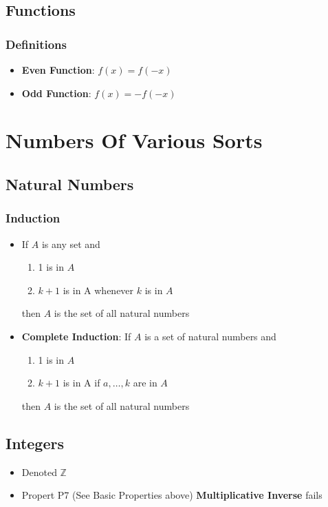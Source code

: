 \documentclass{report}
\begin{document}
\section{Functions}
\subsection*{Definitions}
\begin{itemize}
	\item \textbf{Even Function}: $f (x) = f (-x)$
	\item \textbf{Odd Function}: $f (x) = -f (-x)$
\end{itemize}

\chapter{Numbers Of Various Sorts}%
  \section{Natural Numbers}%
  
  \subsection{Induction}%
    \begin{itemize}
      \item If $A$ is any set and
        \begin{enumerate}
          \item 1 is in $A$
          \item $k+1$ is in A whenever $k$ is in $A$
        \end{enumerate}
        then $A$ is the set of all natural numbers
      \item \textbf{Complete Induction}: If $A$ is a set of natural
          numbers and
        \begin{enumerate}
          \item 1 is in $A$
          \item $k+1$ is in A if $a, \dots, k$ are in $A$
        \end{enumerate}
        then $A$ is the set of all natural numbers
    \end{itemize}

  \section{Integers}
    \begin{itemize}
      \item Denoted $\mathbb{Z}$
      \item Propert P7 (See Basic Properties above) \textbf{Multiplicative Inverse} fails
    \end{itemize}
\end{document}
